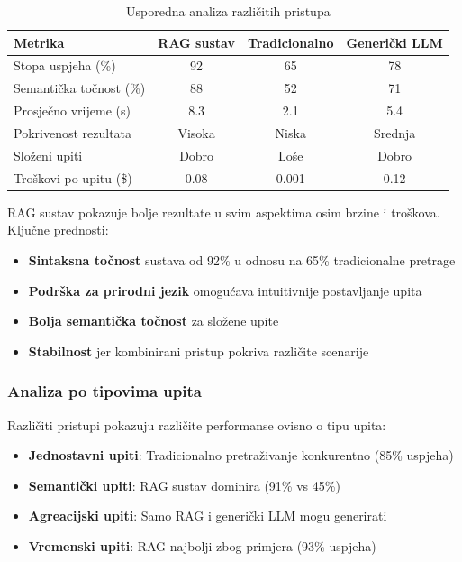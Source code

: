 \begin{table}[htbp]
\centering
\caption{Usporedna analiza različitih pristupa}
\label{tab:comparative_analysis}
\begin{tabular}{|l|c|c|c|}
\hline
\textbf{Metrika} & \textbf{RAG sustav} & \textbf{Tradicionalno} & \textbf{Generički LLM} \\
\hline
Stopa uspjeha (\%) & 92 & 65 & 78 \\
Semantička točnost (\%) & 88 & 52 & 71 \\
Prosječno vrijeme (s) & 8.3 & 2.1 & 5.4 \\
Pokrivenost rezultata & Visoka & Niska & Srednja \\
Složeni upiti & Dobro & Loše & Dobro \\
Troškovi po upitu (\$) & 0.08 & 0.001 & 0.12 \\
\hline
\end{tabular}
\end{table}

RAG sustav pokazuje bolje rezultate u svim aspektima osim brzine i troškova. Ključne prednosti:

\begin{itemize}
    \item \textbf{Sintaksna točnost} sustava od 92\% u odnosu na 65\% tradicionalne pretrage
    \item \textbf{Podrška za prirodni jezik} omogućava intuitivnije postavljanje upita
    \item \textbf{Bolja semantička točnost} za složene upite
    \item \textbf{Stabilnost} jer kombinirani pristup pokriva različite scenarije
\end{itemize}

\subsubsection{Analiza po tipovima upita}

Različiti pristupi pokazuju različite performanse ovisno o tipu upita:

\begin{itemize}
    \item \textbf{Jednostavni upiti}: Tradicionalno pretraživanje konkurentno (85\% uspjeha)
    \item \textbf{Semantički upiti}: RAG sustav dominira (91\% vs 45\%)
    \item \textbf{Agreacijski upiti}: Samo RAG i generički LLM mogu generirati
    \item \textbf{Vremenski upiti}: RAG najbolji zbog primjera (93\% uspjeha)
\end{itemize}

